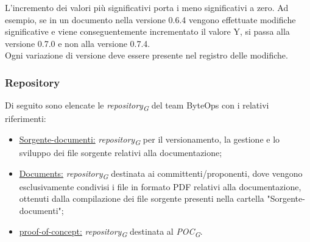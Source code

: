 L'incremento dei valori più significativi porta i meno significativi a zero. Ad esempio, se in un documento nella versione 0.6.4 vengono effettuate modifiche significative e viene conseguentemente incrementato il valore Y, si passa alla versione 0.7.0 e non alla versione 0.7.4. \\
Ogni variazione di versione deve essere presente nel registro delle modifiche.

\subsubsection{Repository}
Di seguito sono elencate le \textit{repository}\textsubscript{\textit{G}} del team ByteOps con i relativi riferimenti:
\begin{itemize}
    \item \href{https://github.com/ByteOps-swe/Sorgente-documenti}{Sorgente-documenti:} \textit{repository}\textsubscript{\textit{G}} per il versionamento, la gestione e lo sviluppo dei file sorgente relativi alla documentazione;
    \item \href{https://github.com/ByteOps-swe/Documents}{Documents:} \textit{repository}\textsubscript{\textit{G}} destinata ai committenti/proponenti, dove vengono esclusivamente condivisi i file in formato PDF relativi alla documentazione, ottenuti dalla compilazione dei file sorgente presenti nella cartella "Sorgente-documenti";
    \item \href{https://github.com/ByteOps-swe/proof-of-concept}{proof-of-concept:} \textit{repository}\textsubscript{\textit{G}} destinata al \textit{POC}\textsubscript{\textit{G}}.
\end{itemize}
